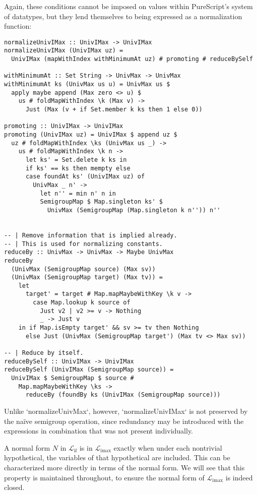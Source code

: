 \documentclass[11pt, twoside, reqno]{book}
\DeclareMathOperator{\imax}{imax}
\DeclareMathOperator{\ifop}{if}
\begin{document}
Again, these conditions cannot be imposed on values within PureScript's system of datatypes, but they lend themselves to being expressed as a normalization function:
\begin{verbatim}
normalizeUnivIMax :: UnivIMax -> UnivIMax
normalizeUnivIMax (UnivIMax uz) =
  UnivIMax (mapWithIndex withMinimumAt uz) # promoting # reduceBySelf

withMinimumAt :: Set String -> UnivMax -> UnivMax
withMinimumAt ks (UnivMax us u) = UnivMax us $
  apply maybe append (Max zero <> u) $
    us # foldMapWithIndex \k (Max v) ->
      Just (Max (v + if Set.member k ks then 1 else 0))

promoting :: UnivIMax -> UnivIMax
promoting (UnivIMax uz) = UnivIMax $ append uz $
  uz # foldMapWithIndex \ks (UnivMax us _) ->
    us # foldMapWithIndex \k n ->
      let ks' = Set.delete k ks in
      if ks' == ks then mempty else
      case foundAt ks' (UnivIMax uz) of
        UnivMax _ n' ->
          let n'' = min n' n in
          SemigroupMap $ Map.singleton ks' $
            UnivMax (SemigroupMap (Map.singleton k n'')) n''


-- | Remove information that is implied already.
-- | This is used for normalizing constants.
reduceBy :: UnivMax -> UnivMax -> Maybe UnivMax
reduceBy
  (UnivMax (SemigroupMap source) (Max sv))
  (UnivMax (SemigroupMap target) (Max tv)) =
    let
      target' = target # Map.mapMaybeWithKey \k v ->
        case Map.lookup k source of
          Just v2 | v2 >= v -> Nothing
          _ -> Just v
    in if Map.isEmpty target' && sv >= tv then Nothing
      else Just (UnivMax (SemigroupMap target') (Max tv <> Max sv))

-- | Reduce by itself.
reduceBySelf :: UnivIMax -> UnivIMax
reduceBySelf (UnivIMax (SemigroupMap source)) =
  UnivIMax $ SemigroupMap $ source #
    Map.mapMaybeWithKey \ks ->
      reduceBy (foundBy ks (UnivIMax (SemigroupMap source)))
\end{verbatim}
Unlike \inHS`normalizeUnivMax`, however, \inHS`normalizeUnivIMax` is not preserved by the na\"ive semigroup operation, since redundancy may be introduced with the expressions in combination that was not present individually.

A normal form \(N\) in \(\mathcal{L}_{\ifop}\) is in \(\mathcal{L}_{\imax}\) exactly when under each nontrivial hypothetical, the variables of that hypothetical are included.
This can be characterized more directly in terms of the normal form.
We will see that this property is maintained throughout, to ensure the normal form of \(\mathcal{L}_{\imax}\) is indeed closed.
\end{document}

